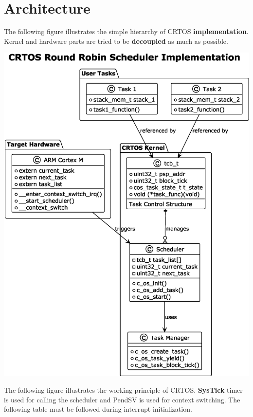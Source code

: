 \chapter{Architecture }
\hypertarget{md_architecture}{}\label{md_architecture}
\label{md_architecture_autotoc_md5}%
%


The following figure illustrates the simple hierarchy of CRTOS {\bfseries{implementation}}. Kernel and hardware parts are tried to be {\bfseries{decoupled}} as much as possible.


\begin{DoxyImageNoCaption}
  \mbox{\includegraphics[width=\textwidth,height=\textheight/2,keepaspectratio=true]{inline_umlgraph_3}}
\end{DoxyImageNoCaption}


The following figure illustrates the working principle of CRTOS. {\bfseries{Sys\+Tick}} timer is used for calling the scheduler and Pend\+SV is used for context switching. The following table must be followed during interrupt initialization.



